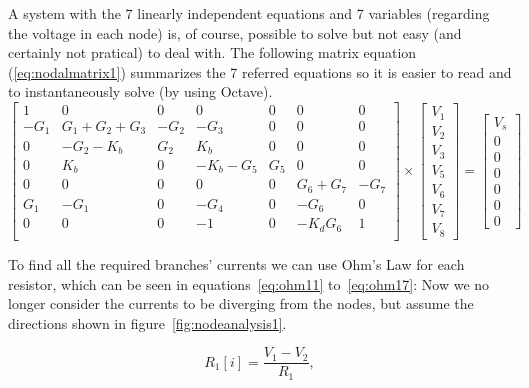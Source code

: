 A system with the 7 linearly independent equations and 7 variables (regarding the voltage in each node) is, of course, possible to solve but not easy (and certainly not pratical) to deal with. The following matrix equation (\ref{eq:nodalmatrix1}) summarizes the 7 referred equations so it is easier to read and to instantaneously solve (by using Octave).
\begin{equation}
\left[ \begin{array}{ccccccc} 
		1 & 0 & 0 & 0 & 0 & 0 & 0 \\ 
		-G_1 & G_1+G_2+G_3 & -G_2 & -G_3 & 0 & 0 & 0 \\
		0 & -G_2-K_b & G_2 & K_b & 0 & 0 & 0 \\ 
		0 & K_b & 0 & -K_b-G_5 & G_5 & 0 & 0  \\ 
		0 & 0 & 0 & 0 & 0 & G_6+G_7 & -G_7  \\ 
		G_1 & -G_1 & 0 & -G_4 & 0 & -G_6 & 0  \\ 
		0 & 0 & 0 & -1 & 0 & -K_dG_6 & 1 \\ 

\end{array} \right]
\times \left[ \begin{array}{c} V_1 \\ V_2 \\ V_3 \\  V_5 \\ V_6 \\ V_7 \\ V_8 \end{array} \right] =
\left[ \begin{array}{c} V_s \\ 0 \\ 0 \\ 0 \\ 0 \\ 0 \\ 0  \end{array} \right]
\label{eq:nodalmatrix1}
\end{equation}

To find all the required branches' currents we can use Ohm's Law for each resistor, which can be seen in equations~\ref{eq:ohm11} to~\ref{eq:ohm17}: Now we no longer consider the currents to be diverging from the nodes, but assume the directions shown in figure~\ref{fig:nodeanalysis1}.


\begin{equation}
  R_1[i] = \frac{V_1 - V_2}{R_1},
  \label{eq:ohm11}
\end{equation}

